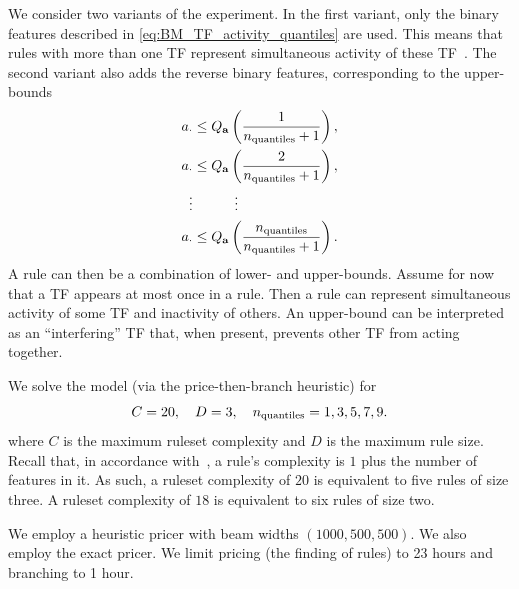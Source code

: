 We consider two variants of the experiment.
In the first variant, only the binary features described in \eqref{eq:BM_TF_activity_quantiles} are used.
This means that rules with more than one TF represent simultaneous activity of these TF~.
The second variant also adds the reverse binary features, corresponding to the upper-bounds
\begin{equation}\label{eq:BM_TF_activity_quantiles_reverse}
    \begin{split}
        a_{\cdot} &\leq Q_{\mathbf{a}}\left(\frac{1}{n_\text{quantiles}+1}\right), \\
        a_{\cdot} &\leq Q_{\mathbf{a}}\left(\frac{2}{n_\text{quantiles}+1}\right), \\
        \vdots & \quad \quad \quad \vdots \\
        a_{\cdot} &\leq Q_{\mathbf{a}}\left(\frac{n_\text{quantiles}}{n_\text{quantiles}+1}\right).
    \end{split}
\end{equation}
A rule can then be a combination of lower- and upper-bounds.
Assume for now that a TF appears at most once in a rule.
Then a rule can represent simultaneous activity of some TF and inactivity of others.
An upper-bound can be interpreted as an ``interfering'' TF that, when present,
prevents other TF from acting together.

We solve the model (via the price-then-branch heuristic) for
\[C = 20, \quad D = 3, \quad n_{\text{quantiles}} = 1, 3, 5, 7, 9. \]
where $C$ is the maximum ruleset complexity and $D$ is the maximum rule size.
Recall that, in accordance with~\cite{lawless_interpretable_2023}, a rule's complexity is $1$ plus the number of features in it.
As such, a ruleset complexity of $20$ is equivalent to five rules of size three.
A ruleset complexity of $18$ is equivalent to six rules of size two.

We employ a heuristic pricer with beam widths $(1000, 500, 500)$.
We also employ the exact pricer.
We limit pricing (the finding of rules) to 23 hours and branching to 1 hour.
